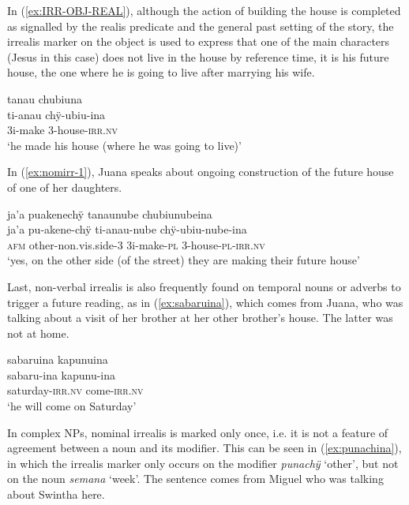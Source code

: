 In (\ref{ex:IRR-OBJ-REAL}), although the action of building the house is completed as signalled by the realis predicate and the general past setting of the story, the irrealis marker on the object is used to express that one of the main characters (Jesus in this case) does not live in the house by reference time, it is his future house, the one where he is going to live after marrying his wife.

\ea\label{ex:IRR-OBJ-REAL}
\begingl 
\glpreamble tanau chubiuna\\
\gla ti-anau chÿ-ubiu-ina\\ 
\glb 3i-make 3-house-\textsc{irr.nv}\\ 
\glft ‘he made his house (where he was going to live)’\\ 
\endgl
\trailingcitation{[jxx-n101013s-1.552]}
\xe

In (\ref{ex:nomirr-1}), Juana speaks about ongoing construction of the future house of one of her daughters.

\ea\label{ex:nomirr-1}
\begingl
\glpreamble ja’a puakenechÿ tanaunube chubiunubeina\\
\gla ja’a pu-akene-chÿ ti-anau-nube chÿ-ubiu-nube-ina\\
\glb \textsc{afm} other-non.vis.side-3 3i-make-\textsc{pl} 3-house-\textsc{pl}-\textsc{irr.nv}\\
\glft ‘yes, on the other side (of the street) they are making their future house’
\endgl
\trailingcitation{[jxx-p110923l-2.154]}
\xe


Last, non-verbal irrealis is also frequently found on temporal nouns or adverbs to trigger a future reading, as in (\ref{ex:sabaruina}), which comes from Juana, who was talking about a visit of her brother at her other brother’s house. The latter was not at home.

\ea\label{ex:sabaruina}
\begingl 
\glpreamble sabaruina kapunuina\\
\gla sabaru-ina kapunu-ina\\ 
\glb saturday-\textsc{irr.nv} come-\textsc{irr.nv}\\ 
\glft ‘he will come on Saturday’\\ 
\endgl
\trailingcitation{[jxx-p120430l-2.411]}
\xe

In complex NPs, nominal irrealis is marked only once, i.e. it is not a feature of agreement between a noun and its modifier. This can be seen in (\ref{ex:punachina}), in which the irrealis marker only occurs on the modifier \textit{punachÿ} ‘other’, but not on the noun \textit{semana} ‘week’. The sentence comes from Miguel who was talking about Swintha here.


